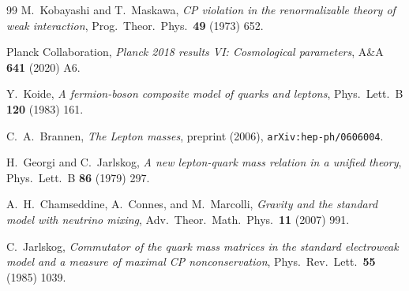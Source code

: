 \documentclass[12pt]{article}
\theoremstyle{definition}
\theoremstyle{remark}
\begin{document}
\begin{thebibliography}{99}
M.~Kobayashi and T.~Maskawa,
\emph{CP violation in the renormalizable theory of weak interaction},
Prog.\ Theor.\ Phys.\ \textbf{49} (1973) 652.

Planck Collaboration,
\emph{Planck 2018 results VI: Cosmological parameters},
A\&A \textbf{641} (2020) A6.

Y.~Koide,
\emph{A fermion-boson composite model of quarks and leptons},
Phys.\ Lett.\ B \textbf{120} (1983) 161.

C.~A.~Brannen,
\emph{The Lepton masses},
preprint (2006), \texttt{arXiv:hep-ph/0606004}.

H.~Georgi and C.~Jarlskog,
\emph{A new lepton-quark mass relation in a unified theory},
Phys.\ Lett.\ B \textbf{86} (1979) 297.

A.~H.~Chamseddine, A.~Connes, and M.~Marcolli,
\emph{Gravity and the standard model with neutrino mixing},
Adv.\ Theor.\ Math.\ Phys.\ \textbf{11} (2007) 991.

C.~Jarlskog,
\emph{Commutator of the quark mass matrices in the standard electroweak model and a measure of maximal CP nonconservation},
Phys.\ Rev.\ Lett.\ \textbf{55} (1985) 1039.

\end{thebibliography}
\end{document}
